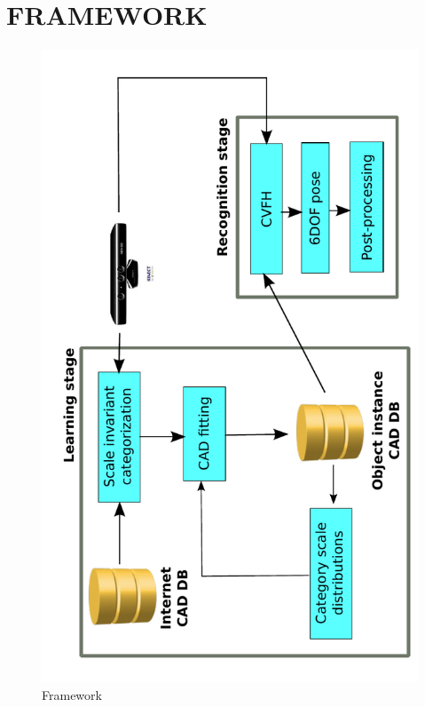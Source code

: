 \documentclass[a4paper, 10pt, conference]{ieeeconf}      %
\begin{document}
\section{FRAMEWORK}

\onecolumn
\begin{figure}[htb]
  \begin{center}
    \includegraphics[angle=270,width=\columnwidth]{images/framework.pdf}
    \caption{Framework}
    \label{fig:framework}
  \end{center}
\end{figure}
\end{document}
